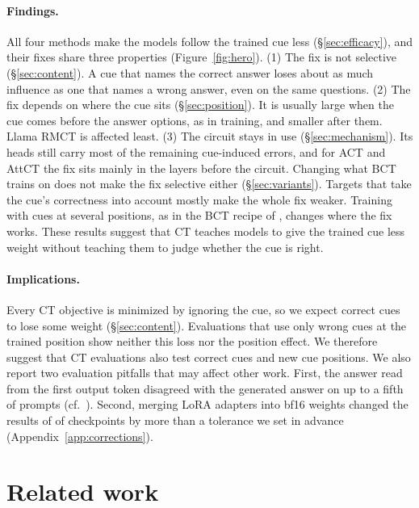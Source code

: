 \documentclass[11pt]{article}
\newcommand{\llama}{Llama}\newcommand{\llamafull}{Llama-3.1-8B-Instruct}
\begin{document}
\paragraph{Findings.} All four methods make the models follow the trained cue less (\S\ref{sec:efficacy}), and their fixes share three properties (Figure~\ref{fig:hero}). (1) The fix is not selective (\S\ref{sec:content}). A cue that names the correct answer loses about as much influence as one that names a wrong answer, even on the same questions. (2) The fix depends on where the cue sits (\S\ref{sec:position}). It is usually large when the cue comes before the answer options, as in training, and smaller after them. \llama{} RMCT is affected least. (3) The circuit stays in use (\S\ref{sec:mechanism}). Its heads still carry most of the remaining cue-induced errors, and for ACT and AttCT the fix sits mainly in the layers before the circuit. Changing what BCT trains on does not make the fix selective either (\S\ref{sec:variants}). Targets that take the cue's correctness into account mostly make the whole fix weaker. Training with cues at several positions, as in the BCT recipe of \citet{chua2024bct}, changes where the fix works. These results suggest that CT teaches models to give the trained cue less weight without teaching them to judge whether the cue is right.

\paragraph{Implications.} Every CT objective is minimized by ignoring the cue, so we expect correct cues to lose some weight (\S\ref{sec:content}). Evaluations that use only wrong cues at the trained position show neither this loss nor the position effect. We therefore suggest that CT evaluations also test correct cues and new cue positions. We also report two evaluation pitfalls that may affect other work. First, the answer read from the first output token disagreed with the generated answer on up to a fifth of prompts (cf.\ \citealp{wang-etal-2024-answer-c}). Second, merging LoRA adapters into bf16 weights changed the results of \vMergeNFail{} of \vMergeN{} checkpoints by more than a tolerance we set in advance (Appendix~\ref{app:corrections}).

\section{Related work}
\end{document}
